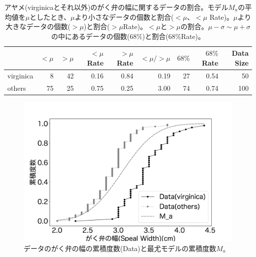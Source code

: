 \begin{table}[h]
    \caption{アヤメ(virginicaとそれ以外)のがく弁の幅に関するデータの割合。モデル$M_a$の平均値を$\mu$としたとき、$\mu$より小さなデータの個数と割合($<\mu$、$<\mu$ Rate)。$\mu$より大きなデータの個数($>\mu$)と割合($>\mu$Rate)。$<\mu$と$>\mu$の割合。$\mu-\sigma\sim \mu+\sigma$の中にあるデータの個数($68\%$)と割合($68\%$Rate)。}
    \label{table:speal_width_virig}
    \centering
    \begin{tabular}{lrrrrrrrr}

        \hline
        {} &  $<\mu$ &  $>\mu$ &  $<\mu$ Rate &  $>\mu$ Rate &  $<\mu/>\mu$ &  $68\%$ &  $68\%$Rate &  Data Size \\
        \hline \hline
        virginica   &     8 &    42 &       0.16 &       0.84 &       0.19 &   27 &     0.54 &         50 \\
        others &    75 &    25 &       0.75 &       0.25 &       3.00 &   74 &     0.74 &        100 \\
        \hline
    \end{tabular}
\end{table}
    
\begin{figure}
    \begin{center}
        \includegraphics[width=15cm]{./image/15_/speal_width_viri.pdf}
        \caption{データのがく弁の幅の累積度数(Data)と最尤モデルの累積度数$M_a$}
        \label{fig:virginica_speal_width_fig}
    \end{center}
\end{figure}

